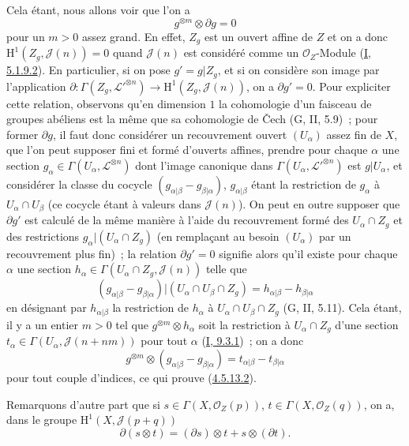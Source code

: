 Cela étant, nous allons voir que l'on a
\begin{equation}
\label{II.4.5.13.2-fr}
  g^{\otimes m}\otimes\partial g=0
\tag{4.5.13.2}
\end{equation}
pour un $m>0$ assez grand. En effet, $Z_g$ est un ouvert affine de $Z$ et
on a donc $\mathrm{H}^1(Z_g,\mathcal{J}(n))=0$ quand $\mathcal{J}(n)$ est
considéré comme un $\mathcal{O}_Z$-Module
(\hyperref[I.5.1.9.2-fr]{I, 5.1.9.2}). En particulier, si on pose
$g'=g|Z_g$, et si on considère son image par l'application
$\partial:\Gamma(Z_g,\mathcal{L}'^{\otimes n})\to
\mathrm{H}^1(Z_g,\mathcal{J}(n))$, on a $\partial g'=0$. Pour expliciter
cette relation, observons qu'en dimension $1$ la cohomologie d'un faisceau
de groupes abéliens est la même que sa cohomologie de Čech (G, II, 5.9)~;
pour former $\partial g$, il faut donc considérer un recouvrement ouvert
$(U_\alpha)$ assez fin de $X$, que l'on peut supposer fini et formé
d'ouverts affines, prendre pour chaque $\alpha$ une section
$g_\alpha\in\Gamma(U_\alpha,\mathcal{L}^{\otimes n})$ dont l'image
canonique dans $\Gamma(U_\alpha,\mathcal{L}'^{\otimes n})$ est
$g|U_\alpha$, et considérer la classe du cocycle
$(g_{\alpha|\beta}-g_{\beta|\alpha})$, $g_{\alpha|\beta}$ étant la
restriction de $g_\alpha$ à $U_\alpha\cap U_\beta$ (ce cocycle étant à
valeurs dans $\mathcal{J}(n)$). On peut en outre supposer que $\partial g'$
est calculé de la même manière à l'aide du recouvrement formé des
$U_\alpha\cap Z_g$ et des restrictions $g_\alpha|(U_\alpha\cap Z_g)$ (en
remplaçant au besoin $(U_\alpha)$ par un recouvrement plus fin)~; la
relation $\partial g'=0$ signifie alors qu'il existe pour chaque $\alpha$
une section $h_\alpha\in\Gamma(U_\alpha\cap Z_g,\mathcal{J}(n))$ telle que
\[
  (g_{\alpha|\beta}-g_{\beta|\alpha})
  |(U_\alpha\cap U_\beta\cap Z_g)
  =h_{\alpha|\beta}-h_{\beta|\alpha}
\]
en désignant par $h_{\alpha|\beta}$ la restriction de $h_\alpha$ à
$U_\alpha\cap U_\beta\cap Z_g$ (G, II, 5.11). Cela étant, il y a un entier
$m>0$ tel que $g^{\otimes m}\otimes h_\alpha$ soit la restriction à
$U_\alpha\cap Z_g$ d'une section
$t_\alpha\in\Gamma(U_\alpha,\mathcal{J}(n+nm))$ pour tout $\alpha$
(\hyperref[I.9.3.1-fr]{I, 9.3.1})~; on a donc
\[
  g^{\otimes m}\otimes(g_{\alpha|\beta}-g_{\beta|\alpha})
  =t_{\alpha|\beta}-t_{\beta|\alpha}
\]
pour tout couple d'indices, ce qui prouve
(\hyperref[II.4.5.13.2-fr]{4.5.13.2}).

Remarquons d'autre part que si
$s\in\Gamma(X,\mathcal{O}_Z(p))$,
$t\in\Gamma(X,\mathcal{O}_Z(q))$, on a, dans le groupe
$\mathrm{H}^1(X,\mathcal{J}(p+q))$
\begin{equation}
\label{II.4.5.13.3-fr}
  \partial(s\otimes t)=(\partial s)\otimes t+s\otimes(\partial t).
\tag{4.5.13.3}
\end{equation}

